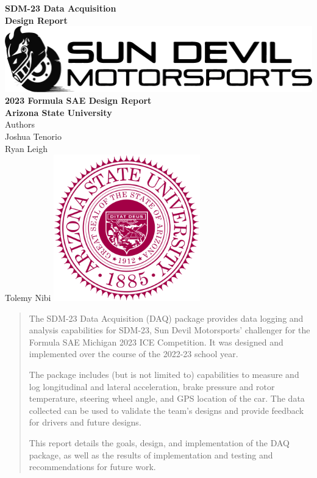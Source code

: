 \documentclass[12pt, notitlepage]{report}
\begin{document}
\begin{titlepage}
    \centering
    \vfill
    \textbf{\Huge SDM-23 Data Acquisition}\vspace{1em}\\
    \textbf{\Large Design Report}
    \vfill
    \includegraphics[width=7.5in]{images/logo.png}
    \vfill
    \textbf{2023 Formula SAE Design Report}\\
    \textbf{Arizona State University}\\
    \vspace{1em}
    Authors\\
        Joshua Tenorio\\
        Ryan Leigh\\
        Tolemy Nibi
    \vfill
    \centering\includegraphics[width=2.5in]{images/seal.png}
    \vfill
\end{titlepage}
\tableofcontents
\pagebreak
\begin{abstract}
    \thispagestyle{plain}
The SDM-23 Data Acquisition (DAQ) package provides data logging and analysis capabilities for SDM-23, Sun Devil Motorsports' challenger for the Formula SAE Michigan 2023 ICE Competition.
It was designed and implemented over the course of the 2022-23 school year.
\vspace{1em}

The package includes (but is not limited to) capabilities to measure and log longitudinal and lateral acceleration, brake pressure and rotor temperature, steering wheel angle, and GPS location of the car.
The data collected can be used to validate the team's designs and provide feedback for drivers and future designs.
\vspace{1em}

This report details the goals, design, and implementation of the DAQ package, as well as the results of implementation and testing and recommendations for future work.
\end{abstract}
\end{document}
